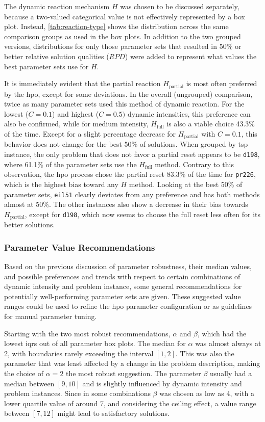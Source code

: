 The dynamic reaction mechanism $H$ was chosen to be discussed separately, because a two-valued categorical value is not effectively represented by a box plot. Instead, \cref{tab:reaction-type} shows the distribution across the same comparison groups as used in the box plots. In addition to the two grouped versions, distributions for only those parameter sets that resulted in 50\% or better relative solution qualities ($RPD$) were added to represent what values the best parameter sets use for $H$.

It is immediately evident that the partial reaction $H_\text{partial}$ is most often preferred by the \glsdesc{hpo}, except for some deviations. In the overall (ungrouped) comparison, twice as many parameter sets used this method of dynamic reaction. For the lowest ($C=0.1$) and highest ($C=0.5)$ dynamic intensities, this preference can also be confirmed, while for medium intensity, $H_\text{full}$ is also a viable choice 43.3\% of the time. Except for a slight percentage decrease for $H_\text{partial}$ with $C=0.1$, this behavior does not change for the best 50\% of solutions.
When grouped by \gls{tsp} instance, the only problem that does not favor a partial reset appears to be \texttt{d198}, where 61.1\% of the parameter sets use the $H_\text{full}$ method. Contrary to this observation, the \gls{hpo} process chose the partial reset 83.3\% of the time for \texttt{pr226}, which is the highest bias toward any $H$ method. Looking at the best 50\% of parameter sets, \texttt{eil51} clearly deviates from any preference and has both methods almost at 50\%. The other instances also show a decrease in their bias towards $H_\text{partial}$, except for \texttt{d198}, which now seems to choose the full reset less often for its better solutions.

\subsubsection{Parameter Value Recommendations}
\label{chap:param-recommend}

Based on the previous discussion of parameter robustness, their median values, and possible preferences and trends with respect to certain combinations of dynamic intensity and problem instance, some general recommendations for potentially well-performing parameter sets are given. These suggested value ranges could be used to refine the \gls{hpo} parameter configuration or as guidelines for manual parameter tuning.

Starting with the two most robust recommendations, $\alpha$ and $\beta$, which had the lowest \glspl{iqr} out of all parameter box plots. The median for $\alpha$ was almost always at 2, with boundaries rarely exceeding the interval $[1,2]$. This was also the parameter that was least affected by a change in the problem description, making the choice of $\alpha = 2$ the most robust suggestion. The parameter $\beta$ usually had a median between $[9,10]$ and is slightly influenced by dynamic intensity and problem instances. Since in some combinations $\beta$ was chosen as low as 4, with a lower quartile value of around 7, and considering the ceiling effect, a value range between $[7,12]$ might lead to satisfactory solutions.

